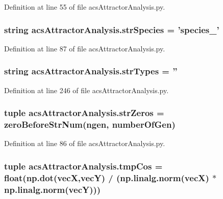 Definition at line 55 of file acs\-Attractor\-Analysis.\-py.

\hypertarget{a00122_aa76707ba3058ba96fc8e5aeafa461193}{
\subsubsection[{str\-Species}]{\setlength{\rightskip}{0pt plus 5cm}string acs\-Attractor\-Analysis.\-str\-Species = 'species\-\_\-'}}\label{a00122_aa76707ba3058ba96fc8e5aeafa461193}


Definition at line 87 of file acs\-Attractor\-Analysis.\-py.

\hypertarget{a00122_ae5f324ca114055fca79473eecd17bb80}{
\subsubsection[{str\-Types}]{\setlength{\rightskip}{0pt plus 5cm}string acs\-Attractor\-Analysis.\-str\-Types = ''}}\label{a00122_ae5f324ca114055fca79473eecd17bb80}


Definition at line 246 of file acs\-Attractor\-Analysis.\-py.

\hypertarget{a00122_a5708d1d44920d75a918ec1c988c02c57}{
\subsubsection[{str\-Zeros}]{\setlength{\rightskip}{0pt plus 5cm}tuple acs\-Attractor\-Analysis.\-str\-Zeros = {\bf zero\-Before\-Str\-Num}(ngen, {\bf number\-Of\-Gen})}}\label{a00122_a5708d1d44920d75a918ec1c988c02c57}


Definition at line 86 of file acs\-Attractor\-Analysis.\-py.

\hypertarget{a00122_a305669433b259c5ffcb797769e7c30df}{
\subsubsection[{tmp\-Cos}]{\setlength{\rightskip}{0pt plus 5cm}tuple acs\-Attractor\-Analysis.\-tmp\-Cos = float(np.\-dot({\bf vec\-X},{\bf vec\-Y}) / (np.\-linalg.\-norm({\bf vec\-X}) $\ast$ np.\-linalg.\-norm({\bf vec\-Y})))}}\label{a00122_a305669433b259c5ffcb797769e7c30df}


